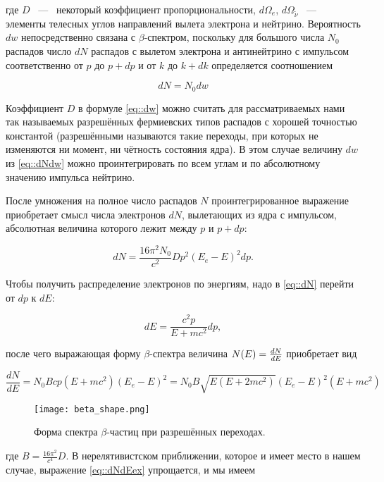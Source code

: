 где $D$ ~---~ некоторый коэффициент пропорциональности, $d\Omega_e$,
$d\Omega_{\widetilde{\nu}}$ ~---~ элементы телесных углов направлений вылета
электрона и нейтрино. Вероятность $dw$ непосредственно связана с
$\beta$-спектром, поскольку для большого числа $N_0$ распадов число $dN$
распадов с вылетом электрона и антинейтрино с импульсом соответственно от $p$
до $p + dp$ и от $k$ до $k + dk$ определяется соотношением

\begin{equation}\label{eq::dNdw}
dN = N_0 dw
\end{equation}

Коэффициент $D$ в формуле \eqref{eq::dw} можно считать для рассматриваемых нами
так называемых разрешённых фермиевских типов распадов с хорошей точностью
константой (разрешёнными называются такие переходы, при которых не изменяются ни
момент, ни чётность состояния ядра). В этом случае величину $dw$ из
\eqref{eq::dNdw} можно проинтегрировать по всем углам и по абсолютному значению
импульса нейтрино.

После умножения на полное число распадов $N$ проинтегрированное выражение
приобретает смысл числа электронов $dN$, вылетающих из ядра с импульсом,
абсолютная величина которого лежит между $p$ и $p + dp$:

\begin{equation}\label{eq::dN}
dN = \frac{16\pi^2 N_0}{c^2}Dp^2(E_e - E)^2dp.
\end{equation}

Чтобы получить распределение электронов по энергиям, надо в \eqref{eq::dN} перейти
от $dp$ к $dE$:

\begin{equation}
dE = \frac{c^2p}{E + mc^2}dp,
\end{equation}

после чего выражающая форму $\beta$-спектра величина $N(E) = \frac{d N}{d E}$
приобретает вид

\begin{equation}\label{eq::dNdEex}
\frac{dN}{dE} = N_0Bcp(E + mc^2)(E_e - E)^2 = N_0B\sqrt{E(E + 2mc^2)}(E_e - E)^2(E + mc^2)
\end{equation}

\begin{wrapfigure}{l}{0.35\linewidth}
  \texttt{[image: beta\_shape.png]}
  \caption{
    Форма спектра $\beta$-частиц при разрешённых переходах.
  }
  \label{img::beta_shape}
\end{wrapfigure}

где $B = \frac{16\pi^2}{c^4}D$. В нерелятивистском приближении, которое и имеет
место в нашем случае, выражение \eqref{eq::dNdEex} упрощается, и мы имеем

